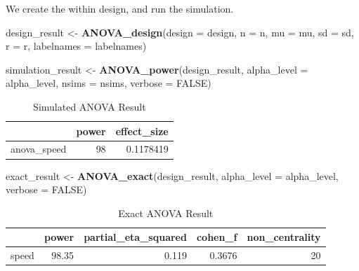 \documentclass[]{book}
\newenvironment{Shaded}{\begin{snugshade}}{\end{snugshade}}
\newcommand{\DataTypeTok}[1]{\textcolor[rgb]{0.13,0.29,0.53}{#1}}
\newcommand{\KeywordTok}[1]{\textcolor[rgb]{0.13,0.29,0.53}{\textbf{#1}}}
\newcommand{\NormalTok}[1]{#1}
\newcommand{\OtherTok}[1]{\textcolor[rgb]{0.56,0.35,0.01}{#1}}
\newcommand{\StringTok}[1]{\textcolor[rgb]{0.31,0.60,0.02}{#1}}
\begin{document}
We create the within design, and run the simulation.

\begin{Shaded}
\begin{Highlighting}[]
\NormalTok{design_result <-}\StringTok{ }\KeywordTok{ANOVA_design}\NormalTok{(}\DataTypeTok{design =}\NormalTok{ design,}
                   \DataTypeTok{n =}\NormalTok{ n, }
                   \DataTypeTok{mu =}\NormalTok{ mu, }
                   \DataTypeTok{sd =}\NormalTok{ sd, }
                   \DataTypeTok{r =}\NormalTok{ r, }
                   \DataTypeTok{labelnames =}\NormalTok{ labelnames)}

\NormalTok{simulation_result <-}\StringTok{ }\KeywordTok{ANOVA_power}\NormalTok{(design_result, }
                                 \DataTypeTok{alpha_level =}\NormalTok{ alpha_level, }
                                 \DataTypeTok{nsims =}\NormalTok{ nsims,}
                                 \DataTypeTok{verbose =} \OtherTok{FALSE}\NormalTok{)}
\end{Highlighting}
\end{Shaded}

\begin{table}[t]

\caption{\label{tab:unnamed-chunk-95}Simulated ANOVA Result}
\centering
\begin{tabular}{l|r|r}
\hline
  & power & effect\_size\\
\hline
anova\_speed & 98 & 0.1178419\\
\hline
\end{tabular}
\end{table}

\begin{Shaded}
\begin{Highlighting}[]
\NormalTok{exact_result <-}\StringTok{ }\KeywordTok{ANOVA_exact}\NormalTok{(design_result,}
                            \DataTypeTok{alpha_level =}\NormalTok{ alpha_level,}
                            \DataTypeTok{verbose =} \OtherTok{FALSE}\NormalTok{)}
\end{Highlighting}
\end{Shaded}

\begin{table}[t]

\caption{\label{tab:unnamed-chunk-97}Exact ANOVA Result}
\centering
\begin{tabular}{l|r|r|r|r}
\hline
  & power & partial\_eta\_squared & cohen\_f & non\_centrality\\
\hline
speed & 98.35 & 0.119 & 0.3676 & 20\\
\hline
\end{tabular}
\end{table}
\end{document}
